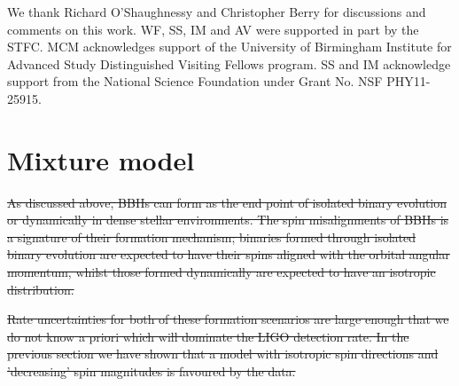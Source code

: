 \documentclass[modern,linenumbers]{aastex61}
\newcommand{\chieff}{\chi_\mathrm{eff}}
\begin{document}


\acknowledgements

We thank Richard O'Shaughnessy and Christopher Berry for discussions and
comments on this work.  WF, SS, IM and AV were supported in part by the STFC.  MCM acknowledges support of the University of
Birmingham Institute for Advanced Study Distinguished Visiting Fellows
program.   SS and IM acknowledge support from the National Science Foundation under Grant No. NSF PHY11-25915.

\appendix

\section{Mixture model}

\sout{As discussed above, BBHs can form as the end point of isolated binary evolution or dynamically in dense stellar environments. The spin misalignments of BBHs is a signature of their formation mechanism; binaries formed through isolated binary evolution are expected to have their spins aligned with the orbital angular momentum, whilst those formed dynamically are expected to have an isotropic distribution.}

\sout{Rate uncertainties for both of these formation scenarios are large enough that we do not know a priori which will dominate the LIGO detection rate. In the previous section we have shown that a model with isotropic spin directions and 'decreasing' spin magnitudes is favoured by the data.}
\end{document}
